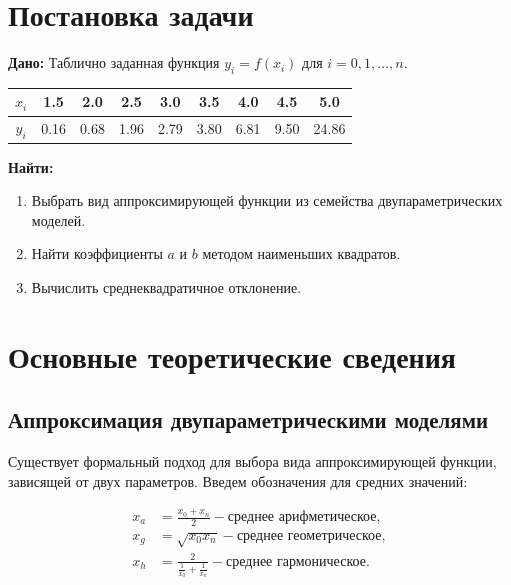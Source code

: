 \documentclass[a4paper, 14pt]{extarticle}
\begin{document}


\renewcommand{\ttdefault}{pcr}

\setlength{\tabcolsep}{3pt}



\newpage
\setcounter{page}{2}

\section{Постановка задачи}

\textbf{Дано:} Таблично заданная функция \( y_i = f(x_i) \) для \( i = 0, 1, \ldots, n \).
\begin{table}[H]
    \centering
    \begin{tabular}{|c|c|c|c|c|c|c|c|c|}
    \hline
    $x_i$ & 1.5 & 2.0 & 2.5 & 3.0 & 3.5 & 4.0 & 4.5 & 5.0 \\
    \hline
    $y_i$ & 0.16 & 0.68 & 1.96 & 2.79 & 3.80 & 6.81 & 9.50 & 24.86 \\
    \hline
    \end{tabular}
\end{table}

\textbf{Найти:}
\begin{enumerate}
    \item Выбрать вид аппроксимирующей функции из семейства двупараметрических моделей.
    \item Найти коэффициенты \( a \) и \( b \) методом наименьших квадратов.
    \item Вычислить среднеквадратичное отклонение.
\end{enumerate}

\section{Основные теоретические сведения}

\subsection{Аппроксимация двупараметрическими моделями}

Существует формальный подход для выбора вида аппроксимирующей функции, зависящей от двух параметров. Введем обозначения для средних значений:

\[
\begin{aligned}
x_a &= \frac{x_0 + x_n}{2} - \text{среднее арифметическое}, \\
x_g &= \sqrt{x_0 x_n} - \text{среднее геометрическое}, \\
x_h &= \frac{2}{\frac{1}{x_0} + \frac{1}{x_n}} - \text{среднее гармоническое}.
\end{aligned}
\]
\end{document}
